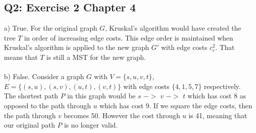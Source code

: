 \documentclass[12pt, oneside]{article}
\begin{document}
\subsection*{Q2: Exercise 2 Chapter 4}
a)
True. For the original graph $G$, Kruskal's algorithm would have created the tree $T$ in order of increasing edge costs. This edge order is maintained when Kruskal's algorithm is applied to the new graph $G'$ with edge costs $c^2_e$. That means that $T$ is still a MST for the new graph.\\\\
b) False. Consider a graph $G$ with $V = \{s,u,v,t\}$, $E = \{(s,u),(s,v),(u,t),(v,t)\}$ with edge costs $\{4,1,5,7\}$ respectively. The shortest path $P$ in this graph would be $s$ $->$ $v$ $->$ $t$ which has cost 8 as opposed to the path through $u$ which has cost 9. If we square the edge costs, then the path through $v$ becomes 50. However the cost through $u$ is 41, meaning that our original path $P$ is no longer valid.\\
\end{document}
